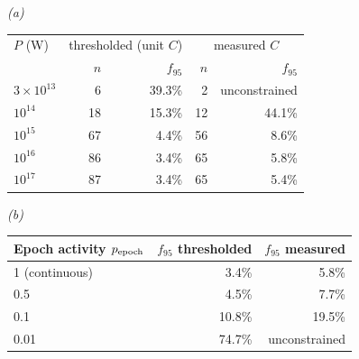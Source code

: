 \emph{(a)}\\[2pt]
\begin{tabular}{@{}lrrrr@{}}
\toprule
$P$ (W) & \multicolumn{2}{c}{thresholded (unit $C$)} &
\multicolumn{2}{c}{measured $C$} \\
 & $n$ & $f_{95}$ & $n$ & $f_{95}$ \\
\midrule
$3\times10^{13}$ & 6 & 39.3\% & 2 & unconstrained \\
$10^{14}$ & 18 & 15.3\% & 12 & 44.1\% \\
$10^{15}$ & 67 & 4.4\% & 56 & 8.6\% \\
$10^{16}$ & 86 & 3.4\% & 65 & 5.8\% \\
$10^{17}$ & 87 & 3.4\% & 65 & 5.4\% \\
\bottomrule
\end{tabular}

\smallskip
\emph{(b)}\\[2pt]
\begin{tabular}{@{}lrr@{}}
\toprule
Epoch activity $p_{\rm epoch}$ & $f_{95}$ thresholded & $f_{95}$ measured \\
\midrule
1 (continuous) & 3.4\% & 5.8\% \\
0.5 & 4.5\% & 7.7\% \\
0.1 & 10.8\% & 19.5\% \\
0.01 & 74.7\% & unconstrained \\
\bottomrule
\end{tabular}
